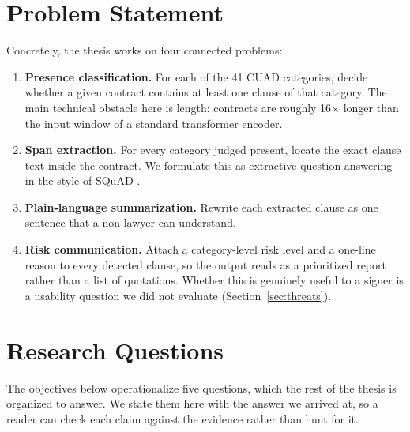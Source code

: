 \section{Problem Statement}
Concretely, the thesis works on four connected problems:
\begin{enumerate}[itemsep=2pt]
  \item \textbf{Presence classification.} For each of the 41 CUAD categories, decide whether a given contract contains at least one clause of that category. The main technical obstacle here is length: contracts are roughly 16$\times$ longer than the input window of a standard transformer encoder.
  \item \textbf{Span extraction.} For every category judged present, locate the exact clause text inside the contract. We formulate this as extractive question answering in the style of SQuAD \cite{rajpurkar2016squad}.
  \item \textbf{Plain-language summarization.} Rewrite each extracted clause as one sentence that a non-lawyer can understand.
  \item \textbf{Risk communication.} Attach a category-level risk level and a one-line reason to every detected clause, so the output reads as a prioritized report rather than a list of quotations. Whether this is genuinely useful to a signer is a usability question we did not evaluate (Section~\ref{sec:threats}).
\end{enumerate}

\section{Research Questions}
\label{sec:rqs}
The objectives below operationalize five questions, which the rest of the thesis is organized to answer. We state them here with the answer we arrived at, so a reader can check each claim against the evidence rather than hunt for it.

